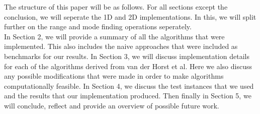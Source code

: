 \documentclass{article}
\begin{document}
{    The structure of this paper will be as follows. For all sections except the conclusion, we will seperate the 1D and 2D implementations. In this, we will split further on the range and mode finding operations seperately.\\
     In Section 2, we will provide a summary of all the algorithms that were implemented. This also includes the naive approaches that were included as benchmarks for our results. In Section 3, we will discuss implementation details for each of the algorithms derived from van der Horst et al. Here we also discuss any possible modifications that were made in order to make algorithms computationally feasible. In Section 4, we discuss the test instances that we used and the results that our implementation produced. Then finally in Section 5, we will conclude, reflect and provide an overview of possible future work. 
}
\end{document}

